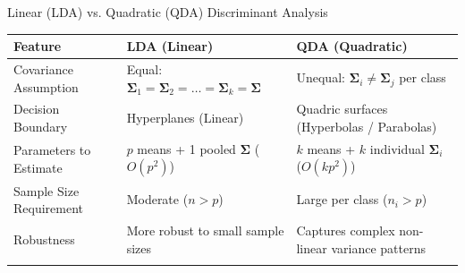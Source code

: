 \documentclass[aspectratio=169,ignorenonframetext]{beamer}
\begin{document}
\begin{frame}{Linear (LDA) vs. Quadratic (QDA) Discriminant Analysis}
{\def\LTcaptype{none} %
\begin{longtable}[]{@{}
  >{\raggedright\arraybackslash}p{}
  >{\raggedright\arraybackslash}p{}
  >{\raggedright\arraybackslash}p{}@{}}
\toprule\noalign{}
\begin{minipage}[b]{\linewidth}\raggedright
\textbf{Feature}
\end{minipage} & \begin{minipage}[b]{\linewidth}\raggedright
\textbf{LDA (Linear)}
\end{minipage} & \begin{minipage}[b]{\linewidth}\raggedright
\textbf{QDA (Quadratic)}
\end{minipage} \\
\midrule\noalign{}
\endhead
Covariance Assumption & Equal:
\(\mathbf{\Sigma}_{1} = \mathbf{\Sigma}_{2} = \ldots = \mathbf{\Sigma}_{k} = \mathbf{\Sigma}\)
& Unequal: \(\mathbf{\Sigma}_{i} \neq \mathbf{\Sigma}_{j}\) per class \\
Decision Boundary & Hyperplanes (Linear) & Quadric surfaces (Hyperbolas
/ Parabolas) \\
Parameters to Estimate & \(p\) means + 1 pooled \(\mathbf{\Sigma}\)
(\(O\left( p^{2} \right)\)) & \(k\) means + \(k\) individual
\(\mathbf{\Sigma}_{i}\) (\(O\left( kp^{2} \right)\)) \\
Sample Size Requirement & Moderate (\(n > p\)) & Large per class
(\(n_{i} > p\)) \\
Robustness & More robust to small sample sizes & Captures complex
non-linear variance patterns \\
\bottomrule\noalign{}
\end{longtable}
}
\end{frame}
\end{document}

